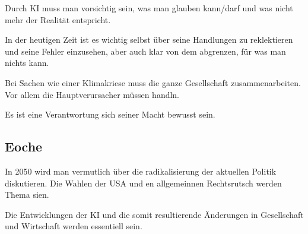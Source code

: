 \documentclass{article}
\begin{document}
Durch KI muss man vorsichtig sein, was man glauben kann/darf und was nicht mehr der Realität entspricht.

In der heutigen Zeit ist es wichtig selbst über seine Handlungen zu reklektieren und seine Fehler einzusehen, aber auch klar von dem abgrenzen, für was man nichts kann.

Bei Sachen wie einer Klimakriese muss die ganze Gesellschaft zusammenarbeiten. Vor allem die Hauptverursacher müssen handln.

Es ist eine Verantwortung sich seiner Macht bewusst sein.

\subsection{Eoche}

In 2050 wird man vermutlich über die radikalisierung der aktuellen Politik diskutieren. Die Wahlen der USA und en allgemeinnen Rechtsrutsch werden Thema sien.

Die Entwicklungen der KI und die somit resultierende Änderungen in Gesellschaft und Wirtschaft werden essentiell sein.
\end{document}
